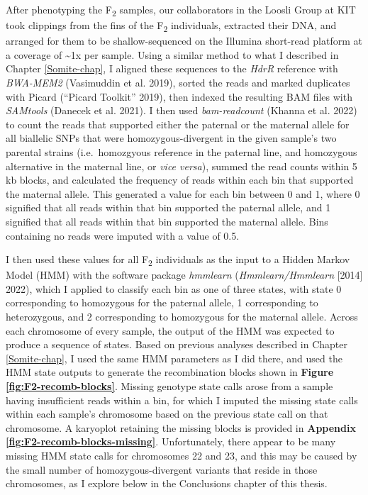 \documentclass[
]{book}
\begin{document}
After phenotyping the F\textsubscript{2} samples, our collaborators in the Loosli Group at KIT took clippings from the fins of the F\textsubscript{2} individuals, extracted their DNA, and arranged for them to be shallow-sequenced on the Illumina short-read platform at a coverage of \textasciitilde1x per sample. Using a similar method to what I described in Chapter \ref{Somite-chap}, I aligned these sequences to the \emph{HdrR} reference with \emph{BWA-MEM2} (Vasimuddin et al. 2019), sorted the reads and marked duplicates with Picard ({``Picard Toolkit''} 2019), then indexed the resulting BAM files with \emph{SAMtools} (Danecek et al. 2021). I then used \emph{bam-readcount} (Khanna et al. 2022) to count the reads that supported either the paternal or the maternal allele for all biallelic SNPs that were homozygous-divergent in the given sample's two parental strains (i.e.~homozgyous reference in the paternal line, and homozygous alternative in the maternal line, or \emph{vice versa}), summed the read counts within 5 kb blocks, and calculated the frequency of reads within each bin that supported the maternal allele. This generated a value for each bin between 0 and 1, where 0 signified that all reads within that bin supported the paternal allele, and 1 signified that all reads within that bin supported the maternal allele. Bins containing no reads were imputed with a value of 0.5.

I then used these values for all F\textsubscript{2} individuals as the input to a Hidden Markov Model (HMM) with the software package \emph{hmmlearn} (\emph{Hmmlearn/Hmmlearn} {[}2014{]} 2022), which I applied to classify each bin as one of three states, with state 0 corresponding to homozygous for the paternal allele, 1 corresponding to heterozygous, and 2 corresponding to homozygous for the maternal allele. Across each chromosome of every sample, the output of the HMM was expected to produce a sequence of states. Based on previous analyses described in Chapter \ref{Somite-chap}, I used the same HMM parameters as I did there, and used the HMM state outputs to generate the recombination blocks shown in \textbf{Figure \ref{fig:F2-recomb-blocks}}. Missing genotype state calls arose from a sample having insufficient reads within a bin, for which I imputed the missing state calls within each sample's chromosome based on the previous state call on that chromosome. A karyoplot retaining the missing blocks is provided in \textbf{Appendix \ref{fig:F2-recomb-blocks-missing}}. Unfortunately, there appear to be many missing HMM state calls for chromosomes 22 and 23, and this may be caused by the small number of homozygous-divergent variants that reside in those chromosomes, as I explore below in the Conclusions chapter of this thesis.
\end{document}
